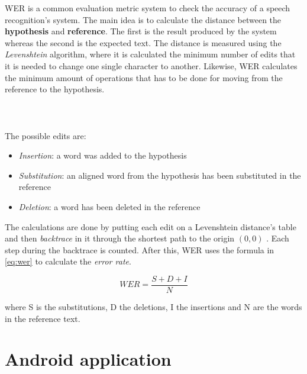 \noindent WER is a common evaluation metric system to check the accuracy of a speech recognition's system. The main idea is to calculate the distance between the \textbf{hypothesis} and \textbf{reference}. The first is the result produced by the system whereas the second is the expected text. The distance is measured using the \textit{Levenshtein} algorithm, where it is calculated the minimum number of edits that it is needed to change one single character to another. Likewise, WER calculates the minimum amount of operations that has to be done for moving from the reference to the hypothesis. \\ \\ \\ \\

\noindent The possible edits are: 

\begin{itemize}
	\item \textit{Insertion}: a word was added to the hypothesis
	\item \textit{Substitution}: an aligned word from the hypothesis has been substituted in the reference
	\item \textit{Deletion}: a word has been deleted in the reference
\end{itemize}

\noindent The calculations are done by putting each edit on a Levenshtein distance's table and then \textit{backtrace} in it through the shortest path to the origin $(0, 0)$ \cite{WER}. Each step during the backtrace is counted. After this, WER uses the formula in \ref{eq:wer} to calculate the \textit{error rate}.

\begin{equation}
\label{eq:wer}
	WER = \frac{S + D + I}{N}
\end{equation}

\noindent where S is the substitutions, D the deletions, I the insertions and N are the words in the reference text.




\section{Android application}
\label{sec:android_app}

